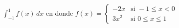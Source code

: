 \item $\displaystyle \int_{-1}^1 f(x) \, dx \text{ en donde } f(x) = \begin{cases} -2x & \text{si } -1 \le x < 0 \\ 3x^2 & \text{si } 0 \le x \le 1 \end{cases}$
